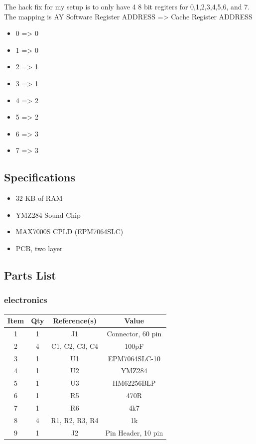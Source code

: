 The hack fix for my setup is to only have 4 8 bit regiters for 0,1,2,3,4,5,6, and 7. The mapping is
AY Software Register ADDRESS => Cache Register ADDRESS

\begin{itemize}
  \item 0 => 0
  \item 1 => 0
  \item 2 => 1
  \item 3 => 1
  \item 4 => 2
  \item 5 => 2
  \item 6 => 3
  \item 7 => 3
\end{itemize}

\subsection{Specifications}

\par
\begin{itemize}
  \item 32 KB of RAM
  \item YMZ284 Sound Chip
  \item MAX7000S CPLD (EPM7064SLC)
  \item PCB, two layer
\end{itemize}

\subsection{Parts List}

\subsubsection{electronics}
\begin{footnotesize}
\begin{longtable}{ |*{4}{c|} }
\hline
{Item} & {Qty} & {Reference(s)} & {Value} \\
\hline
{1} & {1} & {J1} & {Connector, 60 pin} \\
\hline
{2} & {4} & {C1, C2, C3, C4} & {100pF} \\
\hline
{3} & {1} & {U1} & {EPM7064SLC-10} \\
\hline
{4} & {1} & {U2} & {YMZ284} \\
\hline
{5} & {1} & {U3} & {HM62256BLP} \\
\hline
{6} & {1} & {R5} & {470R} \\
\hline
{7} & {1} & {R6} & {4k7} \\
\hline
{8} & {4} & {R1, R2, R3, R4} & {1k} \\
\hline
{9} & {1} & {J2} & {Pin Header, 10 pin} \\
\hline
\end{longtable}
\end{footnotesize}

